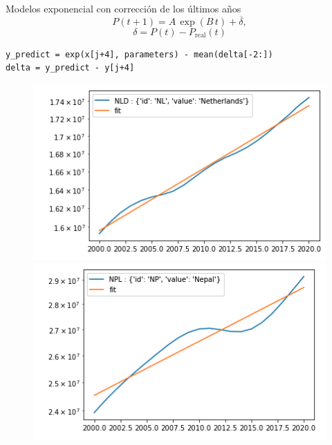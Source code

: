 \documentclass[10pt]{beamer}
\begin{document}
\begin{frame}[fragile]{Modelos exponencial con corrección de los últimos años}
\begin{equation*}
P(t+1) = A\,\exp(B\,t) + \overline{\delta},
\end{equation*}
\begin{equation*}
\delta = P(t) - P_\text{real}(t) 
\end{equation*}
\begin{verbatim}
y_predict = exp(x[j+4], parameters) - mean(delta[-2:])
delta = y_predict - y[j+4]
\end{verbatim}
\begin{figure}
\includegraphics[scale=0.35]{img/7.png}
\includegraphics[scale=0.35]{img/8.png}
\end{figure}
\end{frame}
\end{document}
